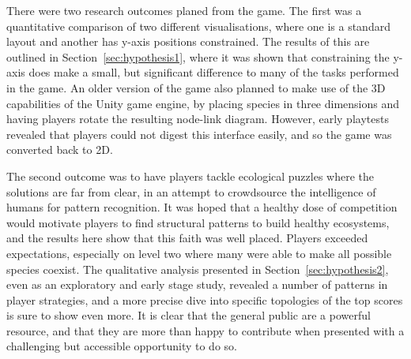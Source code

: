 There were two research outcomes planed from the game. The first was a quantitative comparison of two different visualisations, where one is a standard layout and another has y-axis positions constrained.  The results of this are outlined in Section~\ref{sec:hypothesis1}, where it was shown that constraining the y-axis does make a small, but significant difference to many of the tasks performed in the game.
An older version of the game also planned to make use of the 3D capabilities of the Unity game engine, by placing species in three dimensions and having players rotate the resulting node-link diagram. However, early playtests revealed that players could not digest this interface easily, and so the game was converted back to 2D.

The second outcome was to have players tackle ecological puzzles where the solutions are far from clear, in an attempt to crowdsource the intelligence of humans for pattern recognition. It was hoped that a healthy dose of competition would motivate players to find structural patterns to build healthy ecosystems, and the results here show that this faith was well placed. Players exceeded expectations, especially on level two where many were able to make all possible species coexist.
The qualitative analysis presented in Section~\ref{sec:hypothesis2}, even as an exploratory and early stage study, revealed a number of patterns in player strategies, and a more precise dive into specific topologies of the top scores is sure to show even more.
It is clear that the general public are a powerful resource, and that they are more than happy to contribute when presented with a challenging but accessible opportunity to do so.



